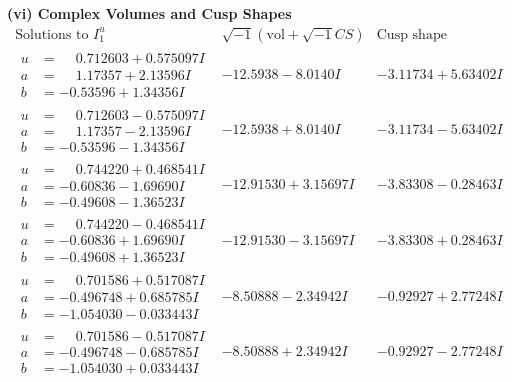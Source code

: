 \documentclass[1p]{elsarticle_modified}
\theoremstyle{definition}
\newcommand{\I}{\sqrt{-1}}
\begin{document}
\newpage\flushleft \textbf{(vi) Complex Volumes and Cusp Shapes}
$$\begin{array}{c|c|c}  
\text{Solutions to }I^u_{1}& \I (\text{vol} + \sqrt{-1}CS) & \text{Cusp shape}\\
 \hline 
\begin{aligned}
u &= \phantom{-}0.712603 + 0.575097 I \\
a &= \phantom{-}1.17357 + 2.13596 I \\
b &= -0.53596 + 1.34356 I\end{aligned}
 & -12.5938 - 8.0140 I & -3.11734 + 5.63402 I \\ \hline\begin{aligned}
u &= \phantom{-}0.712603 - 0.575097 I \\
a &= \phantom{-}1.17357 - 2.13596 I \\
b &= -0.53596 - 1.34356 I\end{aligned}
 & -12.5938 + 8.0140 I & -3.11734 - 5.63402 I \\ \hline\begin{aligned}
u &= \phantom{-}0.744220 + 0.468541 I \\
a &= -0.60836 - 1.69690 I \\
b &= -0.49608 - 1.36523 I\end{aligned}
 & -12.91530 + 3.15697 I & -3.83308 - 0.28463 I \\ \hline\begin{aligned}
u &= \phantom{-}0.744220 - 0.468541 I \\
a &= -0.60836 + 1.69690 I \\
b &= -0.49608 + 1.36523 I\end{aligned}
 & -12.91530 - 3.15697 I & -3.83308 + 0.28463 I \\ \hline\begin{aligned}
u &= \phantom{-}0.701586 + 0.517087 I \\
a &= -0.496748 + 0.685785 I \\
b &= -1.054030 - 0.033443 I\end{aligned}
 & -8.50888 - 2.34942 I & -0.92927 + 2.77248 I \\ \hline\begin{aligned}
u &= \phantom{-}0.701586 - 0.517087 I \\
a &= -0.496748 - 0.685785 I \\
b &= -1.054030 + 0.033443 I\end{aligned}
 & -8.50888 + 2.34942 I & -0.92927 - 2.77248 I \\ \hline\begin{aligned}

\end{aligned}
\end{array}$$
\end{document}
